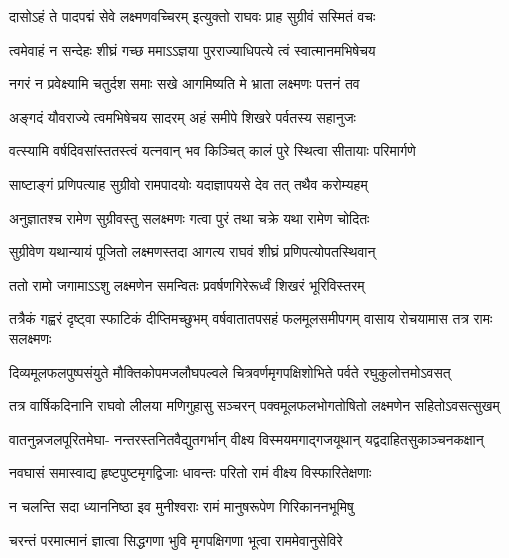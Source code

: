 \twolineshloka
{दासोऽहं ते पादपद्मं सेवे लक्ष्मणवच्चिरम्}
{इत्युक्तो राघवः प्राह सुग्रीवं सस्मितं वचः} %

\twolineshloka
{त्वमेवाहं न सन्देहः शीघ्रं गच्छ ममाऽऽज्ञया}
{पुरराज्याधिपत्ये त्वं स्वात्मानमभिषेचय} %

\twolineshloka
{नगरं न प्रवेक्ष्यामि चतुर्दश समाः सखे}
{आगमिष्यति मे भ्राता लक्ष्मणः पत्तनं तव} %

\twolineshloka
{अङ्गदं यौवराज्ये त्वमभिषेचय सादरम्}
{अहं समीपे शिखरे पर्वतस्य सहानुजः} %

\twolineshloka
{वत्स्यामि वर्षदिवसांस्ततस्त्वं यत्नवान् भव}
{किञ्चित् कालं पुरे स्थित्वा सीतायाः परिमार्गणे} %

\twolineshloka
{साष्टाङ्गं प्रणिपत्याह सुग्रीवो रामपादयोः}
{यदाज्ञापयसे देव तत् तथैव करोम्यहम्} %

\twolineshloka
{अनुज्ञातश्च रामेण सुग्रीवस्तु सलक्ष्मणः}
{गत्वा पुरं तथा चक्रे यथा रामेण चोदितः} %

\twolineshloka
{सुग्रीवेण यथान्यायं पूजितो लक्ष्मणस्तदा}
{आगत्य राघवं शीघ्रं प्रणिपत्योपतस्थिवान्} %

\twolineshloka
{ततो रामो जगामाऽऽशु लक्ष्मणेन समन्वितः}
{प्रवर्षणगिरेरूर्ध्वं शिखरं भूरिविस्तरम्} %

\threelineshloka
{तत्रैकं गह्वरं दृष्ट्वा स्फाटिकं दीप्तिमच्छुभम्}
{वर्षवातातपसहं फलमूलसमीपगम्}
{वासाय रोचयामास तत्र रामः सलक्ष्मणः} %

\fourlineindentedshloka
{दिव्यमूलफलपुष्पसंयुते}
{मौक्तिकोपमजलौघपल्वले}
{चित्रवर्णमृगपक्षिशोभिते}
{पर्वते रघुकुलोत्तमोऽवसत्} %





\fourlineindentedshloka
{तत्र वार्षिकदिनानि राघवो}
{लीलया मणिगुहासु सञ्चरन्}
{पक्वमूलफलभोगतोषितो}
{लक्ष्मणेन सहितोऽवसत्सुखम्} %

\fourlineindentedshloka
{वातनुन्नजलपूरितमेघा-}
{नन्तरस्तनितवैद्युतगर्भान्}
{वीक्ष्य विस्मयमगाद्गजयूथान्}
{यद्वदाहितसुकाञ्चनकक्षान्} %

\twolineshloka
{नवघासं समास्वाद्य हृष्टपुष्टमृगद्विजाः}
{धावन्तः परितो रामं वीक्ष्य विस्फारितेक्षणाः} %

\twolineshloka
{न चलन्ति सदा ध्याननिष्ठा इव मुनीश्वराः}
{रामं मानुषरूपेण गिरिकाननभूमिषु} %

\twolineshloka
{चरन्तं परमात्मानं ज्ञात्वा सिद्धगणा भुवि}
{मृगपक्षिगणा भूत्वा राममेवानुसेविरे} %

